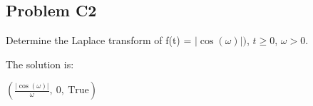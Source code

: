 \subsection{Problem C2} Determine the Laplace transform of f(t) = \(\left|{\cos{\left(\omega \right)}}\right|)\), \(t \geq 0\), \(\omega > 0\).

    \medskip
    The solution is:

    \smallskip
     \(\left( \frac{\left|{\cos{\left(\omega \right)}}\right|}{\omega}, \  0, \  \text{True}\right)\)
